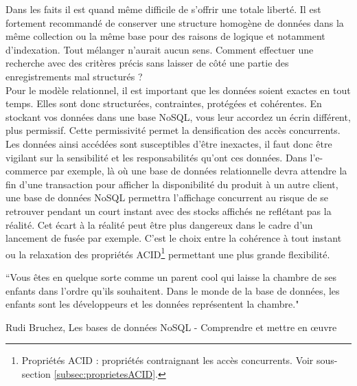 Dans les faits il est quand même difficile de s'offrir une totale liberté. Il est fortement recommandé de conserver une structure homogène de données dans la même collection ou la même base pour des raisons de logique et notamment d'indexation. Tout mélanger n'aurait aucun sens. Comment effectuer une recherche avec des critères précis sans laisser de côté une partie des enregistrements mal structurés ?\\

Pour le modèle relationnel, il est important que les données soient exactes en tout temps. Elles sont donc structurées, contraintes, protégées et cohérentes. En stockant vos données dans une base NoSQL, vous leur accordez un écrin différent, plus permissif. Cette permissivité permet la densification des accès concurrents. Les données ainsi accédées sont susceptibles d'être inexactes, il faut donc être vigilant sur la sensibilité et les responsabilités qu'ont ces données. Dans l'e-commerce par exemple, là où une base de données relationnelle devra attendre la fin d'une transaction pour afficher la disponibilité du produit à un autre client, une base de données NoSQL permettra l'affichage concurrent au risque de se retrouver pendant un court instant avec des stocks affichés ne reflétant pas la réalité. Cet écart à la réalité peut être plus dangereux dans le cadre d'un lancement de fusée par exemple. C'est le choix entre la cohérence à tout instant ou la relaxation des propriétés ACID\footnote{Propriétés ACID : propriétés contraignant les accès concurrents. Voir sous-section \ref{subsec:proprietesACID}.} permettant une plus grande flexibilité. 
\epigraph{``Vous êtes en quelque sorte comme un parent cool qui laisse la chambre de ses enfants dans l'ordre qu'ils souhaitent. Dans le monde de la base de données, les enfants sont les développeurs et les données représentent la chambre."}{\textup{Rudi Bruchez}, Les bases de données NoSQL - Comprendre et mettre en œuvre \cite{BD_NoSQL}}
